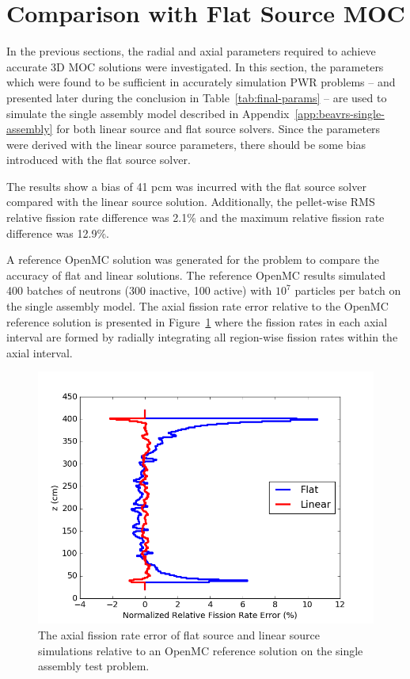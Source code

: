 \newpage
\section{Comparison with Flat Source MOC}
\label{sec:flat-linear-comparison}

In the previous sections, the radial and axial parameters required to achieve accurate 3D \ac{MOC} solutions were investigated. In this section, the parameters which were found to be sufficient in accurately simulation \ac{PWR} problems -- and presented later during the conclusion in Table~\ref{tab:final-params} -- are used to simulate the single assembly model described in Appendix~\ref{app:beavrs-single-assembly} for both linear source and flat source solvers. Since the parameters were derived with the linear source parameters, there should be some bias introduced with the flat source solver.

The results show a bias of 41 pcm was incurred with the flat source solver compared with the linear source solution. Additionally, the pellet-wise \ac{RMS} relative fission rate difference was 2.1\% and the maximum relative fission rate difference was 12.9\%. 

A reference OpenMC solution was generated for the problem to compare the accuracy of flat and linear solutions. The reference OpenMC results simulated 400 batches of neutrons (300 inactive, 100 active) with $10^7$ particles per batch on the single assembly model. The axial fission rate error relative to the OpenMC reference solution is presented in Figure~\ref{fig:fs-ls-axial-error} where the fission rates in each axial interval are formed by radially integrating all region-wise fission rates within the axial interval.

\begin{figure}[h!]
	\centering
	\includegraphics[width=0.7\linewidth]{figures/results/error-plots/sa_fs_ls_axial_error.png}
	\caption[]{The axial fission rate error of flat source and linear source simulations relative to an OpenMC reference solution on the single assembly test problem.}
	\label{fig:fs-ls-axial-error}
\end{figure}

